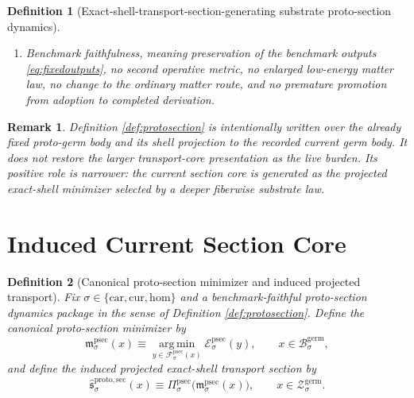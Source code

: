 \documentclass[11pt]{article}
\newcommand{\Car}{\mathrm{car}}
\newcommand{\Cur}{\mathrm{cur}}
\newcommand{\Hom}{\mathrm{hom}}
\newcommand{\GermBody}[1]{\mathcal B_{#1}^{\mathrm{germ}}}
\newcommand{\GermShell}[1]{\mathcal Z_{#1}^{\mathrm{germ}}}
\newcommand{\ProtoProj}[1]{\Pi_{#1}^{\mathrm{proto}}}
\newcommand{\ProtoShell}[1]{\mathcal Z_{#1}^{\mathrm{proto}}}
\newcommand{\ProtoSectionBody}[1]{\mathcal B_{#1}^{\mathrm{psec}}}
\newcommand{\ProtoSectionProj}[1]{\Pi_{#1}^{\mathrm{psec}}}
\newcommand{\ProtoSectionFiber}[2]{\mathcal F_{#1}^{\mathrm{psec}}(#2)}
\newcommand{\ProtoSectionFunctional}[1]{\mathscr E_{#1}^{\mathrm{psec}}}
\newcommand{\ProtoSectionShell}[1]{\mathcal Z_{#1}^{\mathrm{psec}}}
\newcommand{\ProtoSectionMin}[1]{\mathfrak m_{#1}^{\mathrm{psec}}}
\newcommand{\InducedTransportSec}[1]{\widehat{\mathfrak s}_{#1}^{\mathrm{proto,sec}}}
\newtheorem{definition}{Definition}
\newtheorem{remark}{Remark}
\begin{document}
\begin{definition}[Exact-shell-transport-section-generating substrate proto-section dynamics]
\begin{enumerate}
    \[
    \ProtoSectionShell{\sigma}\subset\ProtoSectionBody{\sigma}
    \]
    satisfying
    \[
    \ProtoSectionShell{\sigma}
    =
    \left\{
    y\in\ProtoSectionBody{\sigma}:
    \ProtoProj{\sigma}\bigl(\ProtoSectionProj{\sigma}(y)\bigr)\in\GermShell{\sigma},
    \;
    \ProtoSectionFunctional{\sigma}(y)
    =
    \min_{z\in\ProtoSectionFiber{\sigma}{\ProtoProj{\sigma}(\ProtoSectionProj{\sigma}(y))}}
    \ProtoSectionFunctional{\sigma}(z)
    \right\},
    \]
    and
    \[
    \ProtoSectionProj{\sigma}\big|_{\ProtoSectionShell{\sigma}}
    :
    \ProtoSectionShell{\sigma}
    \xrightarrow{\cong}
    \ProtoShell{\sigma}
    \]
    is a diffeomorphism.
    \item Benchmark faithfulness, meaning preservation of the benchmark outputs \eqref{eq:fixedoutputs}, no second operative metric, no enlarged low-energy matter law, no change to the ordinary matter route, and no premature promotion from adoption to completed derivation.
\end{enumerate}
\end{definition}

\begin{remark}
Definition \ref{def:protosection} is intentionally written over the already fixed proto-germ body and its shell projection to the recorded current germ body. It does not restore the larger transport-core presentation as the live burden. Its positive role is narrower: the current section core is generated as the projected exact-shell minimizer selected by a deeper fiberwise substrate law.
\end{remark}

\section{Induced Current Section Core}

\begin{definition}[Canonical proto-section minimizer and induced projected transport]
\label{def:induced}
Fix \(\sigma\in\{\Car,\Cur,\Hom\}\) and a benchmark-faithful proto-section dynamics package in the sense of Definition \ref{def:protosection}. Define the canonical proto-section minimizer by
\[
\ProtoSectionMin{\sigma}(x)
\equiv
\operatorname*{arg\,min}_{y\in\ProtoSectionFiber{\sigma}{x}}
\ProtoSectionFunctional{\sigma}(y),
\qquad
x\in\GermBody{\sigma},
\]
and define the induced projected exact-shell transport section by
\[
\InducedTransportSec{\sigma}(x)
\equiv
\ProtoSectionProj{\sigma}\bigl(\ProtoSectionMin{\sigma}(x)\bigr),
\qquad
x\in\GermShell{\sigma}.
\]
\end{definition}
\end{document}
